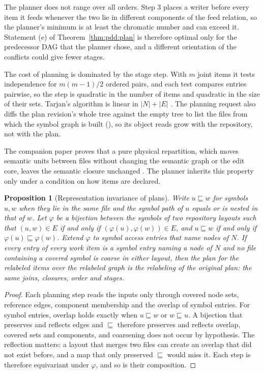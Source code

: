 \documentclass[11pt,letterpaper]{article}
\newtheorem{proposition}[theorem]{Proposition}
\theoremstyle{definition}
\theoremstyle{remark}
\begin{document}
The planner does not range over all orders. Step 3 places a writer before every item it feeds whenever the two lie in different components of the feed relation, so the planner's minimum is at least the chromatic number and can exceed it. Statement (e) of Theorem~\ref{thm:pdd:plan} is therefore optimal only for the predecessor DAG that the planner chose, and a different orientation of the conflicts could give fewer stages.

The cost of planning is dominated by the stage step. With $m$ joint items it tests independence for $m(m-1)/2$ ordered pairs, and each test compares entries pairwise, so the step is quadratic in the number of items and quadratic in the size of their sets. Tarjan's algorithm is linear in $|N|+|E|$ \cite{tarjan1972}. The planning request also diffs the plan revision's whole tree against the empty tree to list the files from which the symbol graph is built (), so its object reads grow with the repository, not with the plan.

The companion paper proves that a pure physical repartition, which moves semantic units between files without changing the semantic graph or the edit core, leaves the semantic closure unchanged \cite{long2026inversion}. The planner inherits this property only under a condition on how items are declared.

\begin{proposition}[Representation invariance of plans]
\label{prop:pdd:invariance}
Write $u\sqsubseteq w$ for symbols $u,w$ when they lie in the same file and the symbol path of $u$ equals or is nested in that of $w$. Let $\varphi$ be a bijection between the symbols of two repository layouts such that $(u,w)\in E$ if and only if $(\varphi(u),\varphi(w))\in E$, and $u\sqsubseteq w$ if and only if $\varphi(u)\sqsubseteq\varphi(w)$. Extend $\varphi$ to symbol access entries that name nodes of $N$. If every entry of every work item is a symbol entry naming a node of $N$ and no file containing a covered symbol is coarse in either layout, then the plan for the relabeled items over the relabeled graph is the relabeling of the original plan: the same joins, closures, order and stages.
\end{proposition}

\begin{proof}
Each planning step reads the inputs only through covered node sets, reference edges, component membership and the overlap of symbol entries. For symbol entries, overlap holds exactly when $u\sqsubseteq w$ or $w\sqsubseteq u$. A bijection that preserves and reflects edges and $\sqsubseteq$ therefore preserves and reflects overlap, covered sets and components, and coarsening does not occur by hypothesis. The reflection matters: a layout that merges two files can create an overlap that did not exist before, and a map that only preserved $\sqsubseteq$ would miss it. Each step is therefore equivariant under $\varphi$, and so is their composition.
\end{proof}
\end{document}
